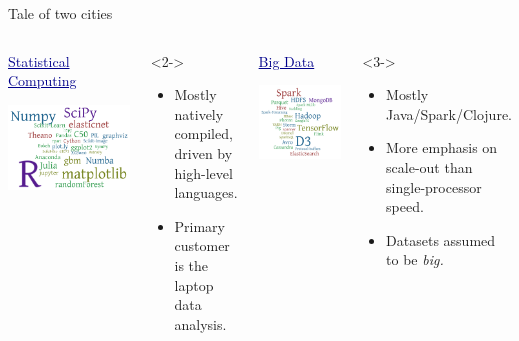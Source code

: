 \documentclass[aspectratio=169]{beamer}
\begin{document}
\begin{frame}{Tale of two cities}
\vspace{0.2 cm}
\begin{columns}
\begin{center}
\textcolor{darkblue}{\Large \underline{Statistical Computing}}

\vspace{0.25 cm}
\vspace{0.125 cm}
\includegraphics[height=3.5 cm]{statistical-software.png}
\vspace{0.125 cm}
\end{center}

\vspace{-0.35 cm}
\begin{uncoverenv}<2->
\begin{itemize}
\item Mostly natively compiled, driven by high-level languages.
\item Primary customer is the laptop data analysis.
\end{itemize}
\end{uncoverenv}

\begin{center}
\textcolor{darkblue}{\Large \underline{Big Data}}

\vspace{0.25 cm}
\includegraphics[height=3.75 cm]{bigdata-software.png}
\end{center}

\vspace{-0.35 cm}
\begin{uncoverenv}<3->
\begin{itemize}
\item Mostly Java/Spark/Clojure.
\item More emphasis on scale-out than single-processor speed.
\item Datasets assumed to be {\it big.}
\end{itemize}
\end{uncoverenv}

\end{columns}
\end{frame}
\end{document}
